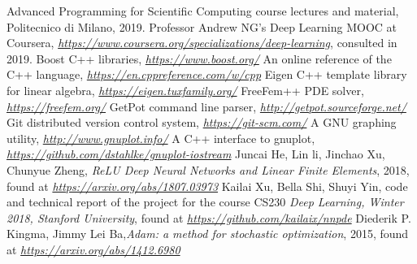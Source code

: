 \documentclass[12pt, a4paper]{report}
\theoremstyle{definition}
\begin{document}
{\begin{lstlisting}[language=FreeFem++, frame=single, name=extimate_dof, showstringspaces=false]
\end{lstlisting}





\newpage
\begin{thebibliography}{10}
	
	 Advanced Programming for Scientific Computing course lectures and material, Politecnico di Milano, 2019.
	 Professor Andrew NG's Deep Learning MOOC at Coursera, \href{https://www.coursera.org/specializations/deep-learning}{\emph{https://www.coursera.org/specializations/deep-learning}}, consulted in 2019.
	 Boost C++ libraries, \href{https://www.boost.org/}{\emph{https://www.boost.org/}}
	 An online reference of the C++ language, \href{https://en.cppreference.com/w/cpp}{\emph{https://en.cppreference.com/w/cpp}}
	 Eigen C++ template library for linear algebra, \href{https://eigen.tuxfamily.org/}{\emph{https://eigen.tuxfamily.org/}}
	 FreeFem++ PDE solver, \href{https://freefem.org/}{\emph{https://freefem.org/}}
	 GetPot command line parser, \href{http://getpot.sourceforge.net/}{\emph{http://getpot.sourceforge.net/}}
	 Git distributed version control system, \href{https://git-scm.com/}{\emph{https://git-scm.com/}}
	 A GNU graphing utility, \href{http://www.gnuplot.info/}{\emph{http://www.gnuplot.info/}}
	 A C++ interface to gnuplot, \href{https://github.com/dstahlke/gnuplot-iostream}{\emph{https://github.com/dstahlke/gnuplot-iostream}}
	 Juncai He, Lin li, Jinchao Xu, Chunyue Zheng, \emph{ReLU Deep Neural Networks and Linear Finite Elements}, 2018, found at \href{https://arxiv.org/abs/1807.03973}{\emph{https://arxiv.org/abs/1807.03973}}
	 Kailai Xu, Bella Shi, Shuyi Yin, code and technical report of the project for the course CS230 \emph{Deep Learning, Winter 2018, Stanford University}, found at \href{https://github.com/kailaix/nnpde}{\emph{https://github.com/kailaix/nnpde}}
	 Diederik P. Kingma, Jimmy Lei Ba,\emph{Adam: a method for stochastic optimization}, 2015, found at
	\href{https://arxiv.org/abs/1412.6980}{\emph{https://arxiv.org/abs/1412.6980}} 

\end{thebibliography}}
\end{document}
